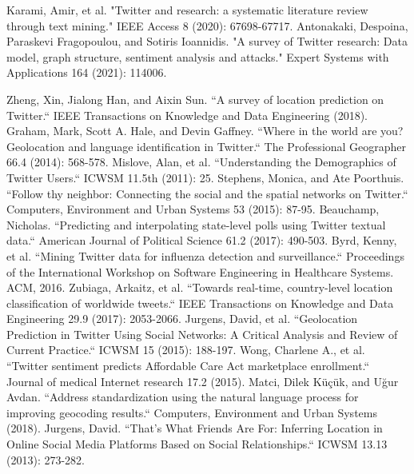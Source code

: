 \begin{thebibliography}{200}
Karami, Amir, et al. "Twitter and research: a systematic literature review through text mining." IEEE Access 8 (2020): 67698-67717.\label{appendix:0.1}
Antonakaki, Despoina, Paraskevi Fragopoulou, and Sotiris Ioannidis. "A survey of Twitter research: Data model, graph structure, sentiment analysis and attacks." Expert Systems with Applications 164 (2021): 114006.\label{appendix:0.2}

Zheng, Xin, Jialong Han, and Aixin Sun. ``A survey of location prediction on Twitter.`` IEEE Transactions on Knowledge and Data Engineering (2018).\label{appendix:1.1}
Graham, Mark, Scott A. Hale, and Devin Gaffney. ``Where in the world are you? Geolocation and language identification in Twitter.`` The Professional Geographer 66.4 (2014): 568-578.\label{appendix:1.2}
Mislove, Alan, et al. ``Understanding the Demographics of Twitter Users.`` ICWSM 11.5th (2011): 25.\label{appendix:1.3}
Stephens, Monica, and Ate Poorthuis. ``Follow thy neighbor: Connecting the social and the spatial networks on Twitter.`` Computers, Environment and Urban Systems 53 (2015): 87-95.\label{appendix:1.4}
Beauchamp, Nicholas. ``Predicting and interpolating state‐level polls using Twitter textual data.`` American Journal of Political Science 61.2 (2017): 490-503.\label{appendix:1.5}
Byrd, Kenny, et al. ``Mining Twitter data for influenza detection and surveillance.`` Proceedings of the International Workshop on Software Engineering in Healthcare Systems. ACM, 2016.\label{appendix:1.6}
Zubiaga, Arkaitz, et al. ``Towards real-time, country-level location classification of worldwide tweets.`` IEEE Transactions on Knowledge and Data Engineering 29.9 (2017): 2053-2066.\label{appendix:1.7}
Jurgens, David, et al. ``Geolocation Prediction in Twitter Using Social Networks: A Critical Analysis and Review of Current Practice.`` ICWSM 15 (2015): 188-197.\label{appendix:1.8}
Wong, Charlene A., et al. ``Twitter sentiment predicts Affordable Care Act marketplace enrollment.`` Journal of medical Internet research 17.2 (2015).\label{appendix:1.9}
Matci, Dilek Küçük, and Uğur Avdan. ``Address standardization using the natural language process for improving geocoding results.`` Computers, Environment and Urban Systems (2018).\label{appendix:1.10}
Jurgens, David. ``That's What Friends Are For: Inferring Location in Online Social Media Platforms Based on Social Relationships.`` ICWSM 13.13 (2013): 273-282.\label{appendix:1.11}

\end{thebibliography}
